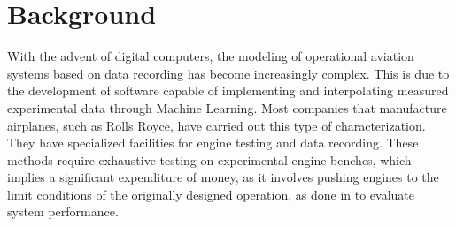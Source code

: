\documentclass{Format}
\begin{document}




\section{Background}\label{sec:back}
With the advent of digital computers, the modeling of operational aviation systems based on data recording has become increasingly complex. This is due to the development of software capable of implementing and interpolating measured experimental data through Machine Learning. Most companies that manufacture airplanes, such as Rolls Royce, have carried out this type of characterization. They have specialized facilities for engine testing and data recording. These methods require exhaustive testing on experimental engine benches, which implies a significant expenditure of money, as it involves pushing engines to the limit conditions of the originally designed operation, as done in \cite{TakeOffBriefingRollsRoyce} to evaluate system performance.
\end{document}
